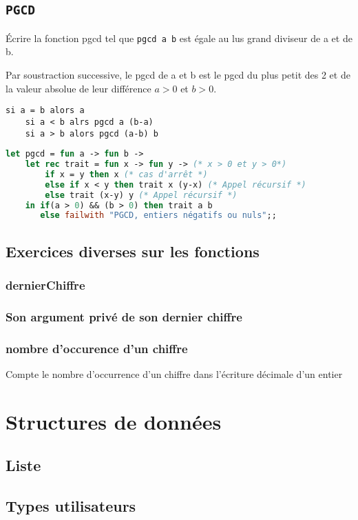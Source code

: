 \subsection{\texttt{PGCD}}
Écrire la fonction pgcd tel que \texttt{pgcd a b} est égale au lus grand diviseur de a et de b.

Par soustraction successive, le pgcd de a et b est le pgcd du plus petit des 2 et de la valeur absolue de leur différence $a>0$ et
$b>0$.
\begin{lstlisting}[language=algo, caption=Exercices -- Algorithme pgcd]
	si a = b alors a
	si a < b alrs pgcd a (b-a)
	si a > b alors pgcd (a-b) b
\end{lstlisting}

\begin{lstlisting}[language=Caml, caption=Exercice -- Fonction pgcd]
let pgcd = fun a -> fun b ->
	let rec trait = fun x -> fun y -> (* x > 0 et y > 0*)
		if x = y then x (* cas d'arrêt *)
		else if x < y then trait x (y-x) (* Appel récursif *)
		else trait (x-y) y (* Appel récursif *)
	in if(a > 0) && (b > 0) then trait a b
	   else failwith "PGCD, entiers négatifs ou nuls";;
\end{lstlisting}

\subsection{Exercices diverses sur les fonctions}
\subsubsection{dernierChiffre}
\subsubsection{Son argument privé de son dernier chiffre}
\subsubsection{nombre d'occurence d'un chiffre}
Compte le nombre d'occurrence d'un chiffre dans l'écriture décimale d'un entier
\section{Structures de données}
\subsection{Liste}



\subsection{Types utilisateurs}





